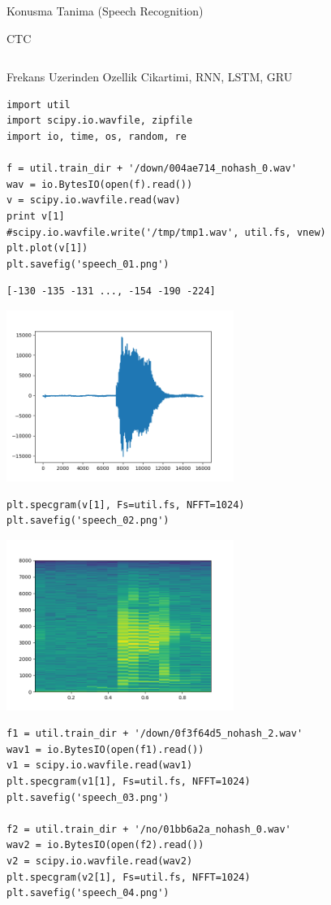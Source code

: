 \documentclass[12pt,fleqn]{article}\usepackage{../../common}
\begin{document}
Konusma Tanima (Speech Recognition)

CTC

\inputminted[fontsize=\footnotesize]{python}{train_ctc.py}

Frekans Uzerinden Ozellik Cikartimi, RNN, LSTM, GRU

\begin{verbatim}
import util
import scipy.io.wavfile, zipfile
import io, time, os, random, re

f = util.train_dir + '/down/004ae714_nohash_0.wav'
wav = io.BytesIO(open(f).read())
v = scipy.io.wavfile.read(wav)
print v[1]
#scipy.io.wavfile.write('/tmp/tmp1.wav', util.fs, vnew)    
plt.plot(v[1])
plt.savefig('speech_01.png')
\end{verbatim}

\begin{verbatim}
[-130 -135 -131 ..., -154 -190 -224]
\end{verbatim}

\includegraphics[width=20em]{speech_01.png}

\begin{verbatim}
plt.specgram(v[1], Fs=util.fs, NFFT=1024)
plt.savefig('speech_02.png')
\end{verbatim}

\includegraphics[width=20em]{speech_02.png}

\begin{verbatim}
f1 = util.train_dir + '/down/0f3f64d5_nohash_2.wav'
wav1 = io.BytesIO(open(f1).read())
v1 = scipy.io.wavfile.read(wav1)
plt.specgram(v1[1], Fs=util.fs, NFFT=1024)
plt.savefig('speech_03.png')

f2 = util.train_dir + '/no/01bb6a2a_nohash_0.wav'
wav2 = io.BytesIO(open(f2).read())
v2 = scipy.io.wavfile.read(wav2)
plt.specgram(v2[1], Fs=util.fs, NFFT=1024)
plt.savefig('speech_04.png')
\end{verbatim}
\end{document}
